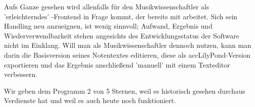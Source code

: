Aufs Ganze gesehen wird  allenfalls für den Musikwissenschaftler als
'erleichterndes' -Frontend in Frage kommt, der bereits mit
 arbeitet. Sich sein Handling neu anzueignen, ist wenig sinnvoll;
Aufwand, Ergebnis und Wiederverwendbarkeit stehen angesichts des
Entwicklungsstatus der Software nicht im Einklang. Will man als Musikwissenschaftler
 dennoch nutzen, kann man darin die Basisversion seines Notentextes
editieren, diese als acc{LilyPond}-Version exportieren und das Ergebnis
anschließend 'manuell' mit einem Texteditor verbessern.

Wir geben dem Programm 2 von 5 Sternen, weil es historisch gesehen durchaus
Verdienste hat und weil es auch heute noch funktioniert.


%
